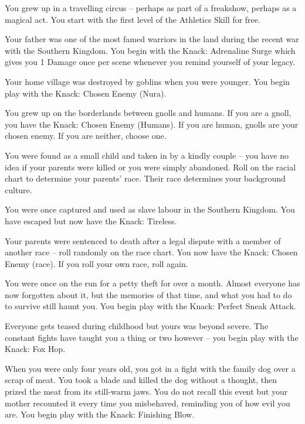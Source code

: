 \begin{multicols}{2}
\begin{list}{\addtocounter{list}{1}\textbf{:}}{\raggedleft}
\item{You grew up in a travelling circus -- perhaps as part of a freakshow, perhaps as a magical act.  You start with the first level of the Athletics Skill for free.}

\item{Your father was one of the most famed warriors in the land during the recent war with the Southern Kingdom.  You begin with the Knack: Adrenaline Surge which gives you 1 Damage once per scene whenever you remind yourself of your legacy.}

\item{Your home village was destroyed by goblins when you were younger.  You begin play with the Knack: Chosen Enemy (Nura).}

\item{You grew up on the borderlands between gnolls and humans.  If you are a gnoll, you have the Knack: Chosen Enemy (Humans).  If you are human, gnolls are your chosen enemy.  If you are neither, choose one.}

\item{You were found as a small child and taken in by a kindly couple -- you have no idea if your parents were killed or you were simply abandoned. Roll on the racial chart to determine your parents' race.  Their race determines your background culture.}

\item{You were once captured and used as slave labour in the Southern Kingdom.  You have escaped but now have the Knack: Tireless.}

\item{Your parents were sentenced to death after a legal dispute with a member of another race -- roll randomly on the race chart.  You now have the Knack: Chosen Enemy (race).  If you roll your own race, roll again.}

\item{You were once on the run for a petty theft for over a month.  Almost everyone has now forgotten about it, but the memories of that time, and what you had to do to survive still haunt you.  You begin play with the Knack: Perfect Sneak Attack.}

\item{Everyone gets teased during childhood but yours was beyond severe.  The constant fights have taught you a thing or two however -- you begin play with the Knack: Fox Hop.}

\item{When you were only four years old, you got in a fight with the family dog over a scrap of meat.  You took a blade and killed the dog without a thought, then prized the meat from its still-warm jaws.  You do not recall this event but your mother recounted it every time you misbehaved, reminding you of how evil you are.  You begin play with the Knack: Finishing Blow.}


\end{list}
\end{multicols}
